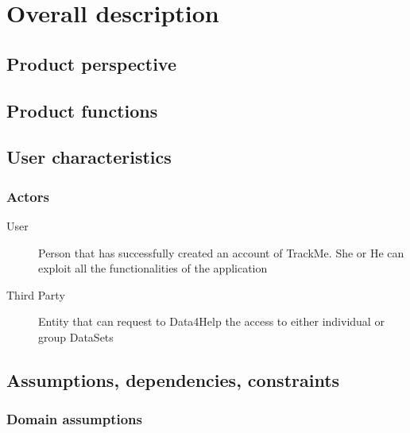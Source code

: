 \documentclass[12pt]{article}
\begin{document}
\clearpage
\section{Overall description}
\label{sec:overdesc}

  \subsection{Product perspective}
  \subsection{Product functions}
  \subsection{User characteristics}

    \subsubsection{Actors}

      \begin{description}
        \item [User] Person that has successfully created an account of TrackMe. She or He can exploit all the functionalities of the application
        \item [Third Party] Entity that can request to Data4Help  the access  to either individual or group DataSets
      \end{description}

  \subsection{Assumptions, dependencies, constraints}

    \subsubsection{Domain assumptions}
\end{document}
